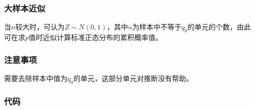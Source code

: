 \subsubsection{大样本近似}
当$n$较大时，可认为$Z\sim N(0,1)$，其中$n$为样本中不等于$q_0$的单元的个数，由此可在求$p$值时近似计算标准正态分布的累积概率值。
\subsubsection{注意事项}
需要去除样本中值为$q_0$的单元，这部分单元对推断没有帮助。
\subsubsection{代码}
\label{sec:sign.test.code}
\inputminted[bgcolor=white, linenos, frame=single, numbersep=5pt, breaklines]{r}{nonparametric-statistics/chapter1/sign-test.R}